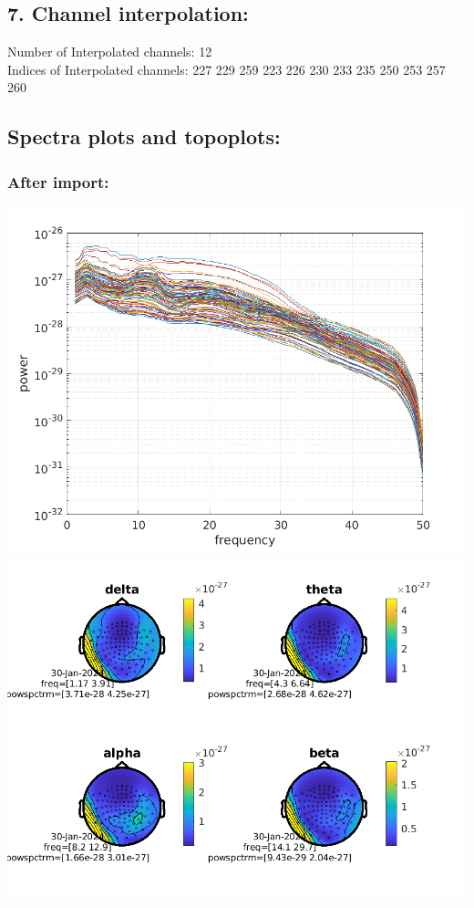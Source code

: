 \documentclass[10pt,a4paper,oneside]{report}
\begin{document}
\subsection*{7. Channel interpolation:}
Number of Interpolated channels: 12 
\\ Indices of Interpolated channels: 227  229  259  223  226  230  233  235  250  253  257  260 
\subsection*{ Spectra plots and topoplots:}
\subsubsection*{After import:}
 \includegraphics[width=14cm]{spectrum_after_import_mag.png}\\
 \includegraphics[width=14cm]{topo_after_import_mag.png}\\
\end{document}
